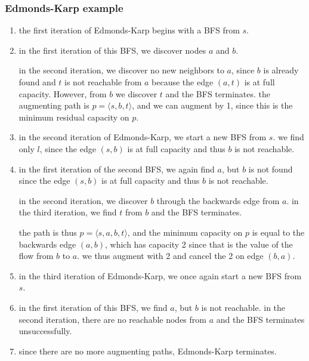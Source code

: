 \subsubsection{Edmonds-Karp example}
\label{sec:edmonds_karp_example}

\begin{enumerate}

  \item the first iteration of Edmonds-Karp begins with a BFS from $s$.

  \item in the first iteration of this BFS, we discover nodes $a$ and $b$.

    in the second iteration, we discover no new neighbors to $a$, since $b$ is
    already found and $t$ is not reachable from $a$ because the edge $(a, t)$ is
    at full capacity. However, from $b$ we discover $t$ and the BFS terminates.
    the augmenting path is $p = \langle s, b, t\rangle$, and we can augment by
    1, since this is the minimum residual capacity on $p$.

  \item in the second iteration of Edmonds-Karp, we start a new BFS from $s$. we
    find only $l$, since the edge $(s, b)$ is at full capacity and thus $b$ is
    not reachable.

  \item in the first iteration of the second BFS, we again find $a$, but $b$ is
    not found since the edge $(s, b)$ is at full capacity and thus $b$ is not
    reachable.

    in the second iteration, we discover $b$ through the backwards edge from
    $a$. in the third iteration, we find $t$ from $b$ and the BFS terminates.

    the path is thus $p = \langle s, a, b, t \rangle$, and the minimum capacity
    on $p$ is equal to the backwards edge $(a, b)$, which has capacity 2 since
    that is the value of the flow from $b$ to $a$. we thus augment with 2 and
    cancel the 2 on edge $(b, a)$.

  \item in the third iteration of Edmonds-Karp, we once again start a new BFS
    from $s$.

  \item in the first iteration of this BFS, we find $a$, but $b$ is not
    reachable. in the second iteration, there are no reachable nodes from $a$
    and the BFS terminates unsuccessfully.

  \item since there are no more augmenting paths, Edmonds-Karp terminates.

\end{enumerate}

